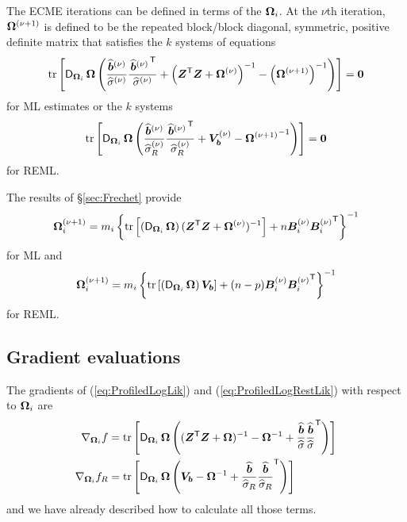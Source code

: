 \documentclass[12pt]{article}
\begin{document}
The ECME iterations can be defined in terms of the $\bm{\Omega}_i$.  At
the $\nu$th iteration, $\bm{\Omega}^{(\nu+1)}$ is defined to be the
repeated block/block diagonal, symmetric, positive definite matrix
that satisfies the $k$ systems of equations
\begin{equation}
  \label{eq:theta1}
  \operatorname{tr}\left[\operatorname{\mathsf{D}}_{\bm{\Omega}_i}\bm{\Omega}\left(
      \frac{\widehat{\bm{b}}^{(\nu)}}{\widehat{\sigma}^{(\nu)}}
      \frac{\left.{\widehat{\bm{b}}}^{(\nu)}\right.^\mathsf{T}}{\widehat{\sigma}^{(\nu)}}+
      \left(\bm{Z}^\mathsf{T}\bm{Z}+\bm{\Omega}^{(\nu)}\right)^{-1}
      -\left(\bm{\Omega}^{(\nu+1)}\right)^{-1}\right)\right]=\bm{0}
\end{equation}
for ML estimates or the $k$ systems
\begin{equation}
  \label{eq:theta1R}
  \operatorname{tr}\left[\operatorname{\mathsf{D}}_{\bm{\Omega}_i}\bm{\Omega}\left(
      \frac{\widehat{\bm{b}}^{(\nu)}}{\widehat{\sigma}_R^{(\nu)}}
      \frac{\left.{\widehat{\bm{b}}}^{(\nu)}\right.^\mathsf{T}}{\widehat{\sigma}_R^{(\nu)}}+
      \bm{V}_{\bm{b}}^{(\nu)}
      -{\bm{\Omega}^{(\nu+1)}}^{-1}\right)\right]=\bm{0}
\end{equation}
for REML.

The results of \S\ref{sec:Frechet} provide
\begin{equation}
  \label{eq:theta1soln}
  \bm{\Omega}_i^{(\nu+1)}=m_i\left\{
    \operatorname{tr} \left[ \left( \operatorname{\mathsf{D}}_{\bm{\Omega}_i} \bm{\Omega} \right)
      (\bm{Z}^\mathsf{T}\bm{Z}+\bm{\Omega}^{(\nu)})^{-1}
    \right]+n\bm{B}_i^{(\nu)}{\bm{B}_i^{(\nu)}}^\mathsf{T}\right\}^{-1}
\end{equation}
for ML and
\begin{equation}
  \label{eq:theta1Rsoln}
  \bm{\Omega}_i^{(\nu+1)}=m_i\left\{
    \operatorname{tr} \left[ \left( \operatorname{\mathsf{D}}_{\bm{\Omega}_i} \bm{\Omega} \right)\bm{V}_{\bm{b}}
    \right]+(n-p)\bm{B}_i^{(\nu)}{\bm{B}_i^{(\nu)}}^\mathsf{T}\right\}^{-1} 
\end{equation}
for REML.
\subsection{Gradient evaluations}
\label{ssec:Gradient}

The gradients of (\ref{eq:ProfiledLogLik}) and (\ref{eq:ProfiledLogRestLik})
with respect to $\bm{\Omega}_i$ are
\begin{align}
  \label{eq:gradDev}
  \nabla_{\bm{\Omega}_i}f&=\operatorname{tr}\left[\operatorname{\mathsf{D}}_{\bm{\Omega}_i}\bm{\Omega}\left(
      (\bm{Z}^\mathsf{T}\bm{Z}+\bm{\Omega})^{-1}-\bm{\Omega}^{-1}+
      \frac{\widehat{\bm{b}}}{\widehat{\sigma}}
      \frac{\widehat{\bm{b}}}{\widehat{\sigma}}^\mathsf{T}\right)\right]\\
  \label{eq:gradDevRest}
  \nabla_{\bm{\Omega}_i} f_R&=\operatorname{tr}\left[\operatorname{\mathsf{D}}_{\bm{\Omega}_i}\bm{\Omega}\left(
      \bm{V}_{\bm{b}}-\bm{\Omega}^{-1}+
      \frac{\widehat{\bm{b}}}{\widehat{\sigma}_R}
      \frac{\widehat{\bm{b}}}{\widehat{\sigma}_R}^\mathsf{T}\right)\right]
\end{align}
and we have already described how to calculate all those terms.
\end{document}
